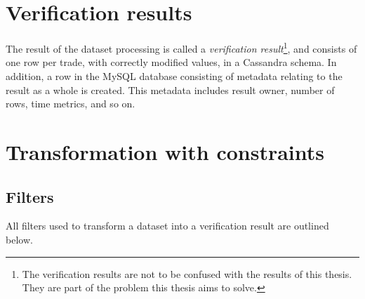 \section{Verification results}
The result of the dataset processing is called a \textit{verification result}\footnote{The verification results are not to be confused with the results of this thesis. They are part of the problem this thesis aims to solve.}, and consists of one row per trade, with correctly modified values, in a Cassandra schema.
In addition, a row in the MySQL database consisting of metadata relating to the result as a whole is created. This metadata includes result owner, number of rows, time metrics, and so on.

\section{Transformation with constraints}
\subsection{Filters}
All filters used to transform a dataset into a verification result are outlined below.

